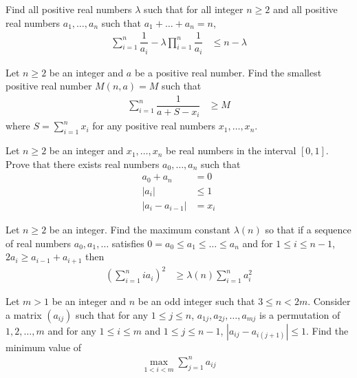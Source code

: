 \documentclass{subfile}
\begin{document}
		\begin{problem}
			Find all positive real numbers $\lambda$ such that for all integer $n\geq 2$ and all positive real numbers $a_{1},\ldots,a_{n}$ such that $a_{1}+\ldots+a_{n}=n$,
				\begin{align*}
					\sum_{i=1}^{n}\dfrac{1}{a_{i}}-\lambda\prod_{i=1}^{n}\dfrac{1}{a_{i}}
						& \leq n-\lambda
				\end{align*}
		\end{problem}
	
		\begin{problem}
			Let $n\geq 2$ be an integer and $a$ be a positive real number. Find the smallest positive real number $M(n,a)=M$ such that
				\begin{align*}
					\sum_{i=1}^{n}\dfrac{1}{a+S-x_{i}}
						& \geq M
				\end{align*}
			where $S=\sum_{i=1}^{n}x_{i}$ for any positive real numbers $x_{1},\ldots,x_{n}$.
		\end{problem}
	
		\begin{problem}
			Let $n\geq2$ be an integer and $x_{1},\ldots,x_{n}$ be real numbers in the interval $[0,1]$. Prove that there exists real numbers $a_{0},\ldots,a_{n}$ such that
				\begin{align*}
					a_{0}+a_{n}
						& = 0\\
					|a_{i}|
						& \leq 1\\
					|a_{i}-a_{i-1}|
						& = x_{i}
				\end{align*}
		\end{problem}
	
		\begin{problem}
			Let $n\geq2$ be an integer. Find the maximum constant $\lambda(n)$ so that if a sequence of real numbers $a_{0},a_{1},\ldots$ satisfies $0=a_{0}\leq a_{1}\leq\ldots\leq a_{n}$ and for $1\leq i\leq n-1$, $2a_{i}\geq a_{i-1}+a_{i+1}$ then
				\begin{align*}
					\left(\sum_{i=1}^{n}ia_{i}\right)^{2}
						& \geq \lambda(n)\sum_{i=1}^{n}a_{i}^{2}
				\end{align*}
		\end{problem}
	
		\begin{problem}
			Let $m>1$ be an integer and $n$ be an odd integer such that $3\leq n<2m$. Consider a matrix $(a_{ij})$ such that for any $1\leq j\leq n$, $a_{1j},a_{2j},\ldots,a_{mj}$ is a permutation of $1,2,\ldots,m$ and  for any $1\leq i\leq m$ and $1\leq j\leq n-1$, $|a_{ij}-a_{i(j+1)}|\leq1$. Find the minimum value of
				\begin{align*}
					\max\limits_{1<i<m}\sum_{j=1}^{n}a_{ij}
				\end{align*}
		\end{problem}
	
\end{document}
